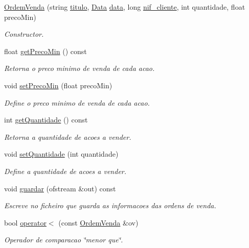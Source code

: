 \begin{DoxyCompactItemize}
\item 
\hyperlink{class_ordem_venda_a90290893a4a714fa7e1b15801a00a452}{Ordem\+Venda} (string \hyperlink{class_ordem_a0773861bd9fb956d5ec62f2ef1de658b}{titulo}, \hyperlink{class_data}{Data} \hyperlink{class_ordem_a9f4dbc2966e98dcbd7e300ae346d8535}{data}, long \hyperlink{class_ordem_af6d06b4250735ae531bdcef5fa332f02}{nif\+\_\+cliente}, int quantidade, float preco\+Min)
\begin{DoxyCompactList}\small\item\em Constructor. \end{DoxyCompactList}\item 
float \hyperlink{class_ordem_venda_a4ebbecbc2fabdeb2f9e6af44c47bd176}{get\+Preco\+Min} () const
\begin{DoxyCompactList}\small\item\em Retorna o preco minimo de venda de cada acao. \end{DoxyCompactList}\item 
void \hyperlink{class_ordem_venda_a5b1ae919558cb5cd7bc892e505abf630}{set\+Preco\+Min} (float preco\+Min)
\begin{DoxyCompactList}\small\item\em Define o preco minimo de venda de cada acao. \end{DoxyCompactList}\item 
int \hyperlink{class_ordem_venda_a0c87b42f245049a1b01f414e508b5692}{get\+Quantidade} () const
\begin{DoxyCompactList}\small\item\em Retorna a quantidade de acoes a vender. \end{DoxyCompactList}\item 
void \hyperlink{class_ordem_venda_a44040292fc692df291cc909d486031de}{set\+Quantidade} (int quantidade)
\begin{DoxyCompactList}\small\item\em Define a quantidade de acoes a vender. \end{DoxyCompactList}\item 
void \hyperlink{class_ordem_venda_a3d6f78188308caac122209e68287e09f}{guardar} (ofstream \&out) const
\begin{DoxyCompactList}\small\item\em Escreve no ficheiro que guarda as informacoes das ordens de venda. \end{DoxyCompactList}\item 
bool \hyperlink{class_ordem_venda_a5e0afea8dc566f2c00a75ab30cc400ae}{operator$<$} (const \hyperlink{class_ordem_venda}{Ordem\+Venda} \&ov)
\begin{DoxyCompactList}\small\item\em Operador de comparacao \char`\"{}menor que\char`\"{}. \end{DoxyCompactList}\end{DoxyCompactItemize}
